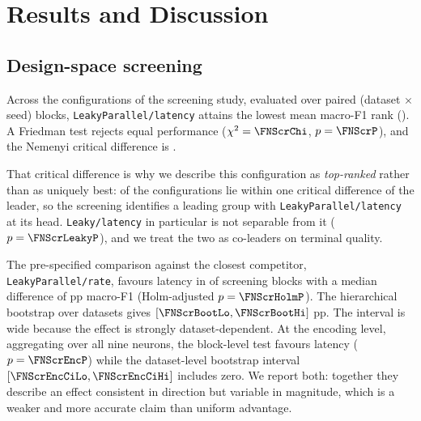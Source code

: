 %
%
%

\section{Results and Discussion}

\subsection{Design-space screening}
\label{sec:res-rank}

Across the \FNScrVariants{} configurations of the screening study, evaluated
over \FNScrBlocks{} paired (dataset $\times$ seed) blocks,
\texttt{LeakyParallel/latency} attains the lowest mean macro-F1 rank
(\FNScrRank). A Friedman test rejects equal performance
($\chi^2=\FNScrChi$, $p=\FNScrP$), and the Nemenyi critical difference is
\FNScrCD.

That critical difference is why we describe this configuration as
\emph{top-ranked} rather than as uniquely best: \FNScrWithinCD{} of the
\FNScrVariants{} configurations lie within one critical difference of the
leader, so the screening identifies a leading group with
\texttt{LeakyParallel/latency} at its head. \texttt{Leaky/latency} in particular
is not separable from it ($p=\FNScrLeakyP$), and we treat the two as co-leaders on
terminal quality.

The pre-specified comparison against the closest competitor,
\texttt{LeakyParallel/rate}, favours latency in \FNScrWinsA{} of
\FNScrBlocks{} screening blocks with a median difference of \FNScrMedDelta{} pp
macro-F1 (Holm-adjusted $p=\FNScrHolmP$). The hierarchical bootstrap over
datasets gives $[\FNScrBootLo, \FNScrBootHi]$ pp. The interval is wide because
the effect is strongly dataset-dependent. At the encoding level, aggregating
over all nine neurons, the block-level test favours latency ($p=\FNScrEncP$) while the
dataset-level bootstrap interval $[\FNScrEncCiLo, \FNScrEncCiHi]$ includes zero. We report
both: together they describe an effect consistent in direction but variable in
magnitude, which is a weaker and more accurate claim than uniform advantage.

